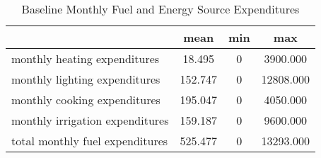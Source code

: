 \begin{table}[htbp]\centering
\def\sym#1{\ifmmode^{#1}\else\(^{#1}\)\fi}
\caption{Baseline Monthly Fuel and Energy Source Expenditures \label{tab:"label"}}
\begin{tabular*}{0.9\hsize}{@{\hskip\tabcolsep\extracolsep\fill}l*{1}{ccc}}
\toprule
                                &     mean&      min&      max\\
\midrule
monthly heating expenditures    &   18.495&        0& 3900.000\\
monthly lighting expenditures   &  152.747&        0&12808.000\\
monthly cooking expenditures    &  195.047&        0& 4050.000\\
monthly irrigation expenditures &  159.187&        0& 9600.000\\
total monthly fuel expenditures &  525.477&        0&13293.000\\
\bottomrule
\end{tabular*}
\end{table}
